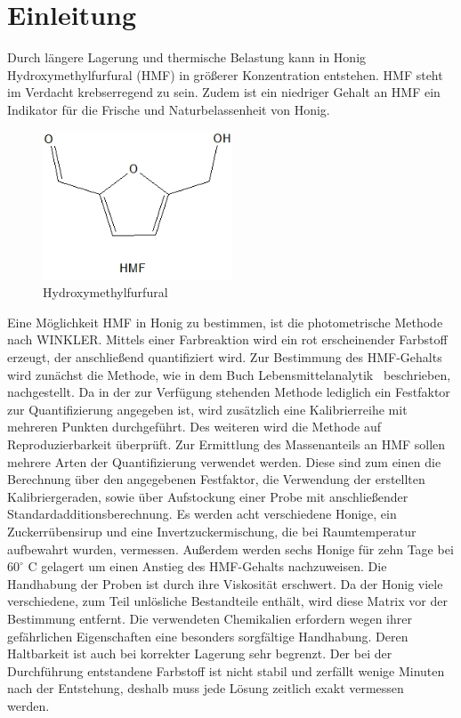 \chapter{Einleitung} 

Durch längere Lagerung und thermische Belastung kann in Honig Hydroxymethylfurfural (HMF) in größerer Konzentration entstehen. HMF steht im Verdacht krebserregend zu sein. Zudem ist ein niedriger Gehalt an HMF ein Indikator für die Frische und Naturbelassenheit von Honig.
\begin{figure}[htbp]
	\centering
		\includegraphics[width=0.5\textwidth]{../Bilder/HMF.jpg}
	\caption{Hydroxymethylfurfural}
	\label{fig:HMF}
\end{figure}
\newline
Eine Möglichkeit HMF in Honig zu bestimmen, ist die photometrische Methode nach WINKLER. Mittels einer Farbreaktion wird ein rot erscheinender Farbstoff erzeugt, der anschließend quantifiziert wird. Zur  Bestimmung des HMF-Gehalts wird zunächst die Methode, wie in dem Buch Lebensmittelanalytik~\cite{Lebensmittelanalytik} beschrieben, nachgestellt. Da in der zur Verfügung stehenden Methode lediglich ein Festfaktor zur Quantifizierung angegeben ist, wird zusätzlich eine Kalibrierreihe mit mehreren Punkten durchgeführt. Des weiteren wird die Methode auf Reproduzierbarkeit überprüft. Zur Ermittlung des Massenanteils an HMF sollen mehrere Arten der Quantifizierung verwendet werden. Diese sind zum einen die Berechnung über den angegebenen Festfaktor, die Verwendung der erstellten Kalibriergeraden, sowie über Aufstockung einer Probe mit anschließender Standardadditionsberechnung. Es werden acht verschiedene Honige, ein Zuckerrübensirup und eine Invertzuckermischung, die bei Raumtemperatur aufbewahrt wurden, vermessen. Außerdem werden sechs Honige für zehn Tage bei $60^\circ$ C gelagert um einen Anstieg des HMF-Gehalts nachzuweisen. Die Handhabung der Proben ist durch ihre Viskosität erschwert. Da der Honig viele verschiedene, zum Teil unlösliche Bestandteile enthält, wird diese Matrix vor der Bestimmung entfernt. Die verwendeten Chemikalien erfordern wegen ihrer gefährlichen Eigenschaften eine besonders sorgfältige Handhabung. Deren Haltbarkeit ist auch bei korrekter Lagerung sehr begrenzt. Der bei der Durchführung entstandene Farbstoff ist nicht stabil und zerfällt wenige Minuten nach der Entstehung, deshalb muss jede Lösung zeitlich exakt vermessen werden.~\cite{Winkler}